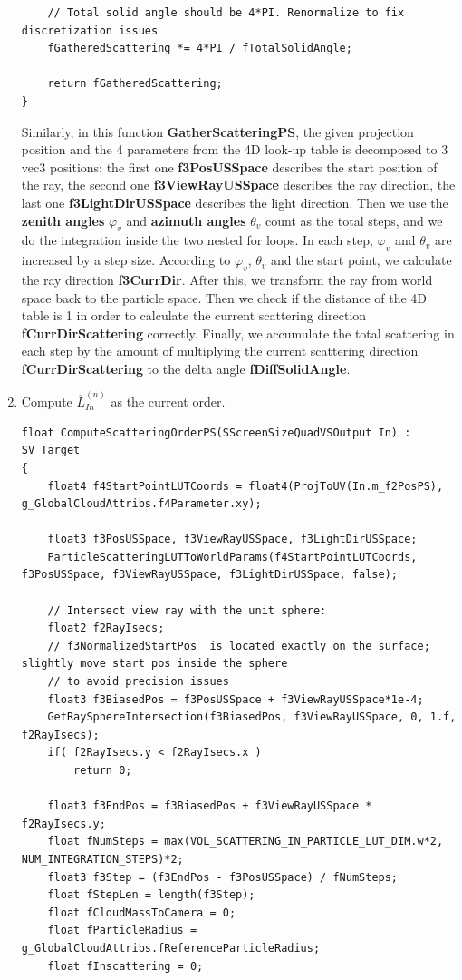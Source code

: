 \begin{enumerate}
\begin{lstlisting}
    // Total solid angle should be 4*PI. Renormalize to fix discretization issues
    fGatheredScattering *= 4*PI / fTotalSolidAngle;

    return fGatheredScattering;
}
\end{lstlisting}
Similarly, in this function \textbf{GatherScatteringPS}, the given projection position and the 4 parameters from the 4D look-up table is decomposed to 3 vec3 positions: the first one \textbf{f3PosUSSpace} describes the start position of the ray, the second one \textbf{f3ViewRayUSSpace} describes the ray direction, the last one \textbf{f3LightDirUSSpace} describes the light direction. Then we use the \textbf{zenith angles} $\varphi_v$ and \textbf{azimuth angles} $\theta_v$ count as the total steps, and we do the integration inside the two nested for loops. In each step, $\varphi_v$ and $\theta_v$ are increased by a step size. According to $\varphi_v$, $\theta_v$ and the start point, we calculate the ray direction \textbf{f3CurrDir}. After this, we transform the ray from world space back to the particle space. Then we check if the distance of the 4D table is 1 in order to calculate the current scattering direction \textbf{fCurrDirScattering} correctly. Finally, we accumulate the total scattering in each step by the amount of multiplying the current scattering direction \textbf{fCurrDirScattering} to the delta angle \textbf{fDiffSolidAngle}.


\item Compute $\overline{L}_{In}^{(n)}$ as the current order.
\begin{lstlisting}
float ComputeScatteringOrderPS(SScreenSizeQuadVSOutput In) : SV_Target
{
    float4 f4StartPointLUTCoords = float4(ProjToUV(In.m_f2PosPS), g_GlobalCloudAttribs.f4Parameter.xy);

    float3 f3PosUSSpace, f3ViewRayUSSpace, f3LightDirUSSpace;
    ParticleScatteringLUTToWorldParams(f4StartPointLUTCoords, f3PosUSSpace, f3ViewRayUSSpace, f3LightDirUSSpace, false);

    // Intersect view ray with the unit sphere:
    float2 f2RayIsecs;
    // f3NormalizedStartPos  is located exactly on the surface; slightly move start pos inside the sphere
    // to avoid precision issues
    float3 f3BiasedPos = f3PosUSSpace + f3ViewRayUSSpace*1e-4;
    GetRaySphereIntersection(f3BiasedPos, f3ViewRayUSSpace, 0, 1.f, f2RayIsecs);
    if( f2RayIsecs.y < f2RayIsecs.x )
        return 0;

    float3 f3EndPos = f3BiasedPos + f3ViewRayUSSpace * f2RayIsecs.y;
    float fNumSteps = max(VOL_SCATTERING_IN_PARTICLE_LUT_DIM.w*2, NUM_INTEGRATION_STEPS)*2;
    float3 f3Step = (f3EndPos - f3PosUSSpace) / fNumSteps;
    float fStepLen = length(f3Step);
    float fCloudMassToCamera = 0;
    float fParticleRadius = g_GlobalCloudAttribs.fReferenceParticleRadius;
    float fInscattering = 0;


\end{lstlisting}
\end{enumerate}
